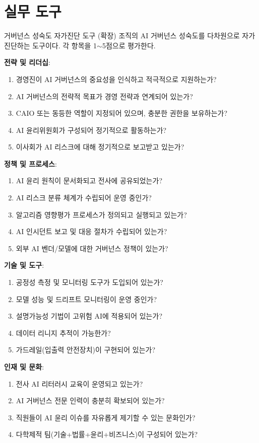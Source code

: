 \section{실무 도구}
\label{sec:20.5}

\begin{practicaltool}{거버넌스 성숙도 자가진단 도구 (확장)}
조직의 AI 거버넌스 성숙도를 다차원으로 자가진단하는 도구이다. 각 항목을 1$\sim$5점으로 평가한다.

\textbf{전략 및 리더십}:
\begin{enumerate}
 \item 경영진이 AI 거버넌스의 중요성을 인식하고 적극적으로 지원하는가?
 \item AI 거버넌스의 전략적 목표가 경영 전략과 연계되어 있는가?
 \item CAIO 또는 동등한 역할이 지정되어 있으며, 충분한 권한을 보유하는가?
 \item AI 윤리위원회가 구성되어 정기적으로 활동하는가?
 \item 이사회가 AI 리스크에 대해 정기적으로 보고받고 있는가?
\end{enumerate}

\textbf{정책 및 프로세스}:
\begin{enumerate}
 \item AI 윤리 원칙이 문서화되고 전사에 공유되었는가?
 \item AI 리스크 분류 체계가 수립되어 운영 중인가?
 \item 알고리즘 영향평가 프로세스가 정의되고 실행되고 있는가?
 \item AI 인시던트 보고 및 대응 절차가 수립되어 있는가?
 \item 외부 AI 벤더/모델에 대한 거버넌스 정책이 있는가?
\end{enumerate}

\textbf{기술 및 도구}:
\begin{enumerate}
 \item 공정성 측정 및 모니터링 도구가 도입되어 있는가?
 \item 모델 성능 및 드리프트 모니터링이 운영 중인가?
 \item 설명가능성 기법이 고위험 AI에 적용되어 있는가?
 \item 데이터 리니지 추적이 가능한가?
 \item 가드레일(입출력 안전장치)이 구현되어 있는가?
\end{enumerate}

\textbf{인재 및 문화}:
\begin{enumerate}
 \item 전사 AI 리터러시 교육이 운영되고 있는가?
 \item AI 거버넌스 전문 인력이 충분히 확보되어 있는가?
 \item 직원들이 AI 윤리 이슈를 자유롭게 제기할 수 있는 문화인가?
 \item 다학제적 팀(기술+법률+윤리+비즈니스)이 구성되어 있는가?
\end{enumerate}


\end{practicaltool}
